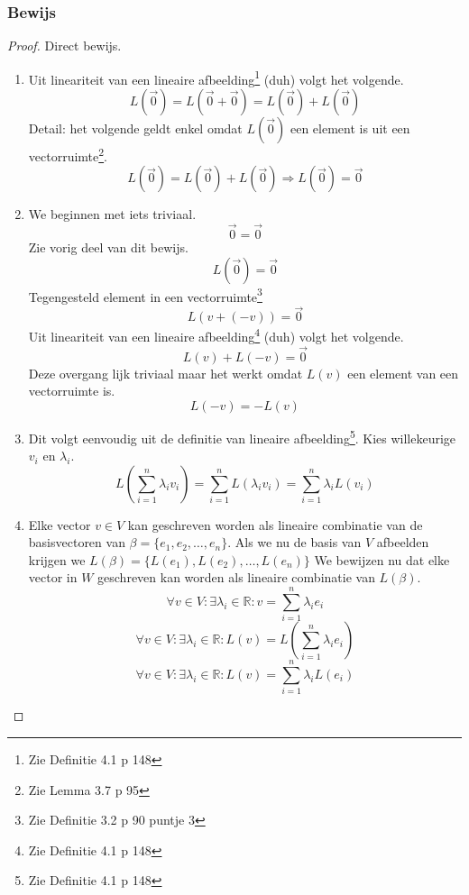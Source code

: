 \documentclass[lineaire_algebra_oplossingen.tex]{subfiles}
\begin{document}
\subsubsection*{Bewijs}
\begin{proof}
Direct bewijs.
\begin{enumerate}
\item
Uit lineariteit van een lineaire afbeelding\footnote{Zie Definitie 4.1 p 148} (duh) volgt het volgende.
\[
L(\vec{0}) = L(\vec{0} + \vec{0}) = L(\vec{0}) + L(\vec{0})
\]
Detail: het volgende geldt enkel omdat $L(\vec{0})$ een element is uit een vectorruimte\footnote{Zie Lemma 3.7 p 95}.
\[
L(\vec{0}) = L(\vec{0}) + L(\vec{0}) \Rightarrow L(\vec{0}) = \vec{0}
\]
\item
We beginnen met iets triviaal.
\[\vec{0}=\vec{0}\]
Zie vorig deel van dit bewijs.
\[L(\vec{0}) = \vec{0}\]
Tegengesteld element in een vectorruimte\footnote{Zie Definitie 3.2 p 90 puntje 3}
\[L(v + (-v)) = \vec{0}\]
Uit lineariteit van een lineaire afbeelding\footnote{Zie Definitie 4.1 p 148} (duh) volgt het volgende.
\[L(v) + L(-v) = \vec{0}\]
Deze overgang lijk triviaal maar het werkt omdat $L(v)$ een element van een vectorruimte is.
\[L(-v) = - L(v)\]
\item
Dit volgt eenvoudig uit de definitie van lineaire afbeelding\footnote{Zie Definitie 4.1 p 148}. Kies willekeurige $v_i$ en $\lambda_i$.
\[L\left(\sum_{i=1}^n\lambda_iv_i\right) =  \sum_{i=1}^nL(\lambda_iv_i)= \sum_{i=1}^n\lambda_iL(v_i)\]
\item
Elke vector $v\in V$ kan geschreven worden als lineaire combinatie van de basisvectoren van $\beta = \{e_1,e_2,\ldots,e_n\}$. Als we nu de basis van $V$ afbeelden krijgen we $L(\beta) = \{L(e_1),L(e_2),\ldots,L(e_n)\}$ We bewijzen nu dat elke vector in $W$ geschreven kan worden als lineaire combinatie van $L(\beta)$.
\[
\forall v \in V:\exists\lambda_i \in \mathbb{R}: v= \sum_{i=1}^n\lambda_ie_i
\]
\[
\forall v \in V:\exists\lambda_i \in \mathbb{R}: L(v)= L(\sum_{i=1}^n\lambda_ie_i)
\]
\[
\forall v \in V:\exists\lambda_i \in \mathbb{R}: L(v)= \sum_{i=1}^n\lambda_iL(e_i)
\]
\end{enumerate}
\end{proof}
\end{document}
